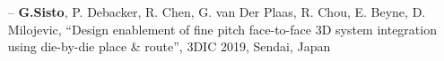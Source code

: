 \documentclass[10pt,a4paper]{altacv}
\begin{document}
\begin{fullwidth}
\begin{itemize}
    \setlength{\itemindent}{0.5em}
    \item[--] \small{\textbf{G.Sisto}, P. Debacker, R. Chen, G. van Der Plaas, R. Chou, E. Beyne, D. Milojevic, “Design enablement of fine pitch face-to-face 3D system integration using die-by-die place \& route”, 3DIC 2019, Sendai, Japan}
\end{itemize}
\end{fullwidth}
\end{document}

